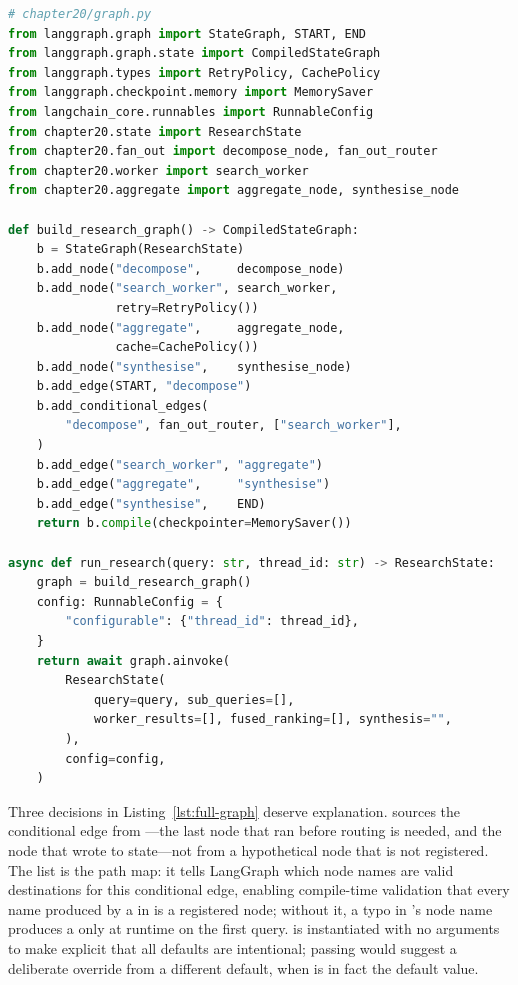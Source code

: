 \begin{lstlisting}[language=Python,
  caption={Graph assembly: correct fan-out topology, \texttt{RetryPolicy},
           and \texttt{CachePolicy}},
  label={lst:full-graph}]
# chapter20/graph.py
from langgraph.graph import StateGraph, START, END
from langgraph.graph.state import CompiledStateGraph
from langgraph.types import RetryPolicy, CachePolicy
from langgraph.checkpoint.memory import MemorySaver
from langchain_core.runnables import RunnableConfig
from chapter20.state import ResearchState
from chapter20.fan_out import decompose_node, fan_out_router
from chapter20.worker import search_worker
from chapter20.aggregate import aggregate_node, synthesise_node

def build_research_graph() -> CompiledStateGraph:
    b = StateGraph(ResearchState)
    b.add_node("decompose",     decompose_node)
    b.add_node("search_worker", search_worker,
               retry=RetryPolicy())
    b.add_node("aggregate",     aggregate_node,
               cache=CachePolicy())
    b.add_node("synthesise",    synthesise_node)
    b.add_edge(START, "decompose")
    b.add_conditional_edges(
        "decompose", fan_out_router, ["search_worker"],
    )
    b.add_edge("search_worker", "aggregate")
    b.add_edge("aggregate",     "synthesise")
    b.add_edge("synthesise",    END)
    return b.compile(checkpointer=MemorySaver())

async def run_research(query: str, thread_id: str) -> ResearchState:
    graph = build_research_graph()
    config: RunnableConfig = {
        "configurable": {"thread_id": thread_id},
    }
    return await graph.ainvoke(
        ResearchState(
            query=query, sub_queries=[],
            worker_results=[], fused_ranking=[], synthesis="",
        ),
        config=config,
    )
\end{lstlisting}

Three decisions in Listing~\ref{lst:full-graph} deserve explanation.
sources the conditional edge from ---the last node that
ran before routing is needed, and the node that wrote 
to state---not from a hypothetical  node that is not
registered. The  list is the path map: it tells
LangGraph which node names are valid destinations for this conditional edge,
enabling compile-time validation that every name produced by a
 in  is a registered node; without it, a
typo in 's  node name produces a
 only at runtime on the first query.
 is instantiated with no arguments to make explicit that
all defaults are intentional; passing 
would suggest a deliberate override from a different default, when
 is in fact the default value.

